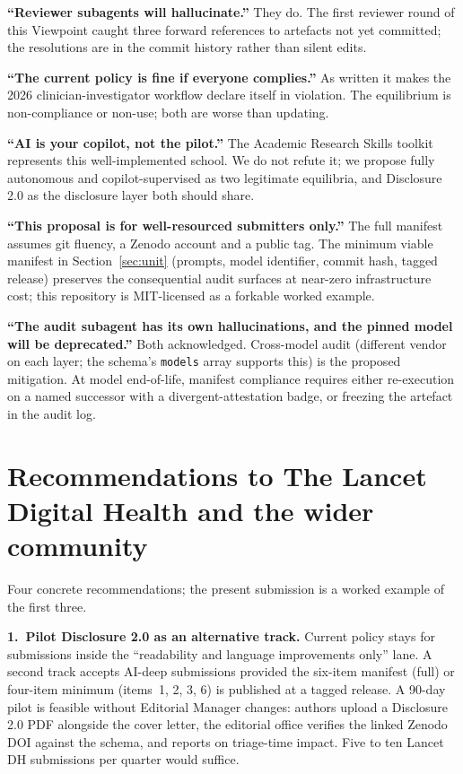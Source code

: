 \documentclass[11pt,a4paper]{article}
\begin{document}
\textbf{``Reviewer subagents will hallucinate.''} They do. The first reviewer round of this Viewpoint caught three forward references to artefacts not yet committed; the resolutions are in the commit history rather than silent edits.

\textbf{``The current policy is fine if everyone complies.''} As written it makes the 2026 clinician-investigator workflow declare itself in violation. The equilibrium is non-compliance or non-use; both are worse than updating.

\textbf{``AI is your copilot, not the pilot.''} The Academic Research Skills toolkit\citep{ars2026} represents this well-implemented school. We do not refute it; we propose fully autonomous and copilot-supervised as two legitimate equilibria, and Disclosure 2.0 as the disclosure layer both should share.

\textbf{``This proposal is for well-resourced submitters only.''} The full manifest assumes git fluency, a Zenodo account and a public tag. The minimum viable manifest in Section~\ref{sec:unit} (prompts, model identifier, commit hash, tagged release) preserves the consequential audit surfaces at near-zero infrastructure cost; this repository is MIT-licensed as a forkable worked example.

\textbf{``The audit subagent has its own hallucinations, and the pinned model will be deprecated.''} Both acknowledged. Cross-model audit (different vendor on each layer; the schema's \texttt{models} array supports this) is the proposed mitigation. At model end-of-life, manifest compliance requires either re-execution on a named successor with a divergent-attestation badge, or freezing the artefact in the audit log.

\section{Recommendations to The Lancet Digital Health and the wider community}\label{sec:reco}

Four concrete recommendations; the present submission is a worked example of the first three.

\textbf{1.~Pilot Disclosure 2.0 as an alternative track.} Current policy stays for submissions inside the ``readability and language improvements only'' lane. A second track accepts AI-deep submissions provided the six-item manifest (full) or four-item minimum (items~1, 2, 3, 6) is published at a tagged release. A 90-day pilot is feasible without Editorial Manager changes: authors upload a Disclosure 2.0 PDF alongside the cover letter, the editorial office verifies the linked Zenodo DOI against the schema, and reports on triage-time impact. Five to ten Lancet DH submissions per quarter would suffice.
\end{document}

